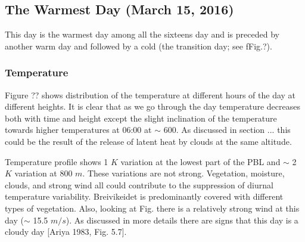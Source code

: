 \documentclass[a4paper,12pt]{article}
\numberwithin{equation}{section} %
\begin{document}
\subsection{The Warmest Day (March 15, 2016)}

This day is the warmest day among all the sixteens day and is preceded by another warm day and followed by a cold (the transition day; see fFig.?).

\subsubsection{Temperature}

Figure ?? shows distribution of the temperature at different hours of the day at different heights. It is clear that as we go through the day temperature decreases both with time and height except the slight inclination of the temperature towards higher temperatures at 06:00 at $\sim$ 600. As discussed in section ... this could be the result of the release of latent heat by clouds at the same altitude. 

Temperature profile shows 1 $K$ variation at the lowest part of the PBL and $\sim$ 2 $K$ variation at 800 $m$. These variations are not strong. Vegetation, moisture, clouds, and strong wind all could contribute to the suppression of diurnal temperature variability. Breivikeidet is predominantly covered with different types of vegetation. Also, looking at Fig. there is a relatively strong wind at this day ($\sim$ 15.5 $m/s$). As discussed in more details there are signs that this day is a cloudy day [Ariya 1983, Fig. 5.7]. 
\end{document}
